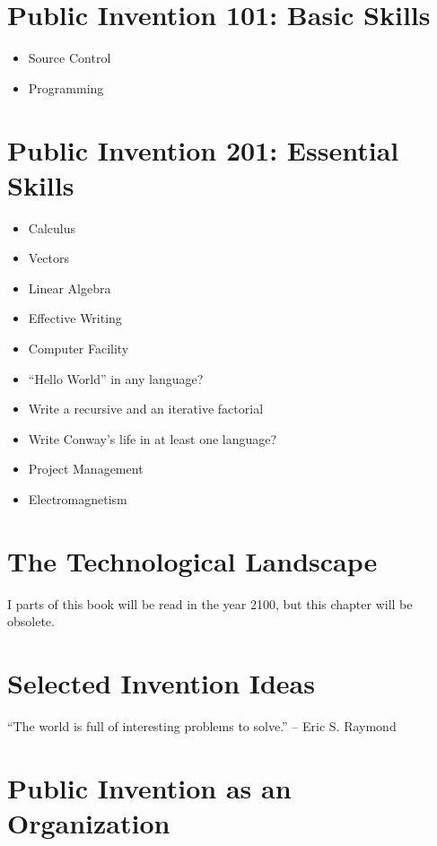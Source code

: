 \documentclass[
	fontsize=10pt, %
	twoside=false, %
	secnumdepth=1, %
]{kaobook}
\begin{document}
\chapter{Public Invention 101: Basic Skills}

\begin{itemize}
\item Source Control
\item Programming

\end{itemize}


\chapter{Public Invention 201: Essential Skills}

\begin{itemize}
\item Calculus
\item Vectors
\item Linear Algebra
\item Effective Writing
\item Computer Facility
\item “Hello World” in any language?
\item Write a recursive and an iterative factorial
\item Write Conway’s life in at least one language?
\item Project Management
\item Electromagnetism
\end{itemize}

\chapter{The Technological Landscape}

I parts of this book will be read in the year 2100, but this chapter
will be obsolete.





\chapter{Selected Invention Ideas}

``The world is full of interesting problems to solve.'' -- Eric S. Raymond


\chapter{Public Invention as an Organization}
\end{document}
